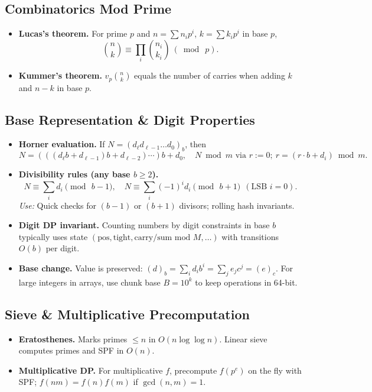 \documentclass[9pt]{extarticle}
\begin{document}
\subsection{Combinatorics Mod Prime}
\begin{itemize}
  \item \textbf{Lucas's theorem.} For prime $p$ and $n=\sum n_i p^i$, $k=\sum k_i p^i$ in base $p$,
  \[
    \binom{n}{k}\equiv \prod_i \binom{n_i}{k_i}\ (\bmod\ p).
  \]
  \item \textbf{Kummer's theorem.} $v_p\!\binom{n}{k}$ equals the number of carries when adding $k$ and $n-k$ in base $p$.
\end{itemize}

\subsection{Base Representation \& Digit Properties}
\begin{itemize}
  \item \textbf{Horner evaluation.} If $N=(d_\ell d_{\ell-1}\dots d_0)_b$, then
  \[
    N = (((d_\ell b + d_{\ell-1})b + d_{\ell-2})\cdots)b + d_0, \quad
    N \bmod m \text{ via } r:=0;\ r=(r\cdot b + d_i)\bmod m.
  \]
  \item \textbf{Divisibility rules (any base $b\ge 2$).}
  \[
    N \equiv \sum_i d_i \pmod{\,b-1},\quad
    N \equiv \sum_i (-1)^i d_i \pmod{\,b+1}\ \ (\text{LSB }i=0).
  \]
  \emph{Use:} Quick checks for $(b-1)$ or $(b+1)$ divisors; rolling hash invariants.
  \item \textbf{Digit DP invariant.} Counting numbers by digit constraints in base $b$ typically uses state $(\text{pos},\text{tight},\text{carry/sum mod }M,\dots)$ with transitions $O(b)$ per digit.
  \item \textbf{Base change.} Value is preserved: $(d)_b=\sum_i d_i b^i=\sum_j e_j c^j = (e)_c$. For large integers in arrays, use chunk base $B=10^k$ to keep operations in 64-bit.
\end{itemize}

\subsection{Sieve \& Multiplicative Precomputation}
\begin{itemize}
  \item \textbf{Eratosthenes.} Marks primes $\le n$ in $O(n\log\log n)$. Linear sieve computes primes and SPF in $O(n)$.
  \item \textbf{Multiplicative DP.} For multiplicative $f$, precompute $f(p^e)$ on the fly with SPF; $f(nm)=f(n)f(m)$ if $\gcd(n,m)=1$.
\end{itemize}
\end{document}
